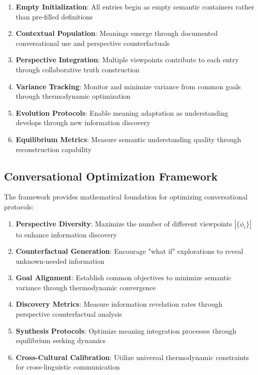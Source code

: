 \documentclass[11pt,a4paper]{article}
\begin{document}
\begin{enumerate}
\item \textbf{Empty Initialization}: All entries begin as empty semantic containers rather than pre-filled definitions
\item \textbf{Contextual Population}: Meanings emerge through documented conversational use and perspective counterfactuals
\item \textbf{Perspective Integration}: Multiple viewpoints contribute to each entry through collaborative truth construction
\item \textbf{Variance Tracking}: Monitor and minimize variance from common goals through thermodynamic optimization
\item \textbf{Evolution Protocols}: Enable meaning adaptation as understanding develops through new information discovery
\item \textbf{Equilibrium Metrics}: Measure semantic understanding quality through reconstruction capability
\end{enumerate}

\subsection{Conversational Optimization Framework}

The framework provides mathematical foundation for optimizing conversational protocols:

\begin{enumerate}
\item \textbf{Perspective Diversity}: Maximize the number of different viewpoints $|\{\phi_i\}|$ to enhance information discovery
\item \textbf{Counterfactual Generation}: Encourage "what if" explorations to reveal unknown-needed information
\item \textbf{Goal Alignment}: Establish common objectives to minimize semantic variance through thermodynamic convergence
\item \textbf{Discovery Metrics}: Measure information revelation rates through perspective counterfactual analysis
\item \textbf{Synthesis Protocols}: Optimize meaning integration processes through equilibrium seeking dynamics
\item \textbf{Cross-Cultural Calibration}: Utilize universal thermodynamic constraints for cross-linguistic communication
\end{enumerate}
\end{document}
